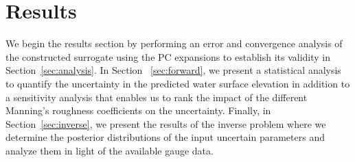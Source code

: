 \section{Results}
\label{sec:results}
We begin the results section by performing an error and convergence 
analysis of the constructed surrogate using the PC expansions to 
establish its validity in Section~\ref{sec:analysis}.  In Section
~\ref{sec:forward}, we present a statistical analysis to quantify the 
uncertainty in the predicted water surface elevation in addition to a 
sensitivity analysis that enables us to rank the impact of the 
different Manning's roughness coefficients on the uncertainty. Finally, 
in Section~\ref{sec:inverse}, we present the results of the inverse problem 
where we determine the posterior distributions of the input uncertain
parameters and analyze them in light of the available gauge data.



